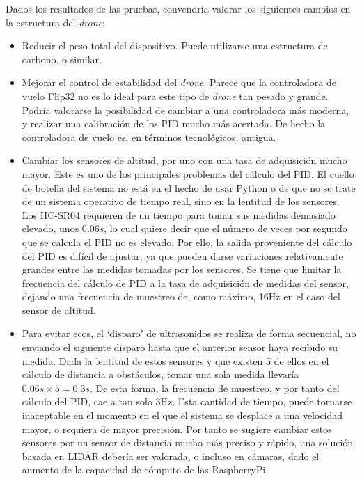 Dados los resultados de las pruebas, convendría valorar los siguientes cambios en la estructura del \emph{drone}: 
\begin{itemize}
\item Reducir el peso total del dispositivo. Puede utilizarse una estructura de carbono, o similar.
\item Mejorar el control de estabilidad del \emph{drone}. Parece que la controladora de vuelo Flip32 no es lo ideal para este tipo de \emph{drone} tan pesado y grande. Podría valorarse la posibilidad de cambiar a una controladora más moderna, y realizar una calibración de los PID mucho más acertada. De hecho la controladora de vuelo es, en términos tecnológicos, antigua.
\item Cambiar los sensores de altitud, por uno con una tasa de adquisición mucho mayor. Este es uno de los principales problemas del cálculo del PID. El cuello de botella del sistema no está en el hecho de usar Python o de que no se trate de un sistema operativo de tiempo real, sino en la lentitud de los sensores. Los HC-SR04 requieren de un tiempo para tomar sus medidas demasiado elevado, unos $0.06s$, lo cual quiere decir que el número de veces por segundo que se calcula el PID no es elevado. Por ello, la salida proveniente del cálculo del PID es difícil de ajustar, ya que pueden darse variaciones relativamente grandes entre las medidas tomadas por los sensores. Se tiene que limitar la frecuencia del cálculo de PID a la tasa de adquisición de medidas del sensor, dejando una frecuencia de muestreo de, como máximo, 16Hz en el caso del sensor de altitud. 
\item Para evitar ecos, el `disparo' de ultrasonidos se realiza de forma secuencial, no enviando el siguiente disparo hasta que el anterior sensor haya recibido su medida. Dada la lentitud de estos sensores y que existen 5 de ellos en el cálculo de distancia a obstáculos, tomar una sola medida llevaría $0.06s \times 5 = 0.3s$. De esta forma, la frecuencia de muestreo, y por tanto del cálculo del PID, cae a tan solo 3Hz. Esta cantidad de tiempo, puede tornarse inaceptable en el momento en el que el sistema se desplace a una velocidad mayor, o requiera de mayor precisión. Por tanto se sugiere cambiar estos sensores por un sensor de distancia mucho más preciso y rápido, una solución basada en LIDAR debería ser valorada, o incluso en cámaras, dado el aumento de la capacidad de cómputo de las RaspberryPi.
\end{itemize}




